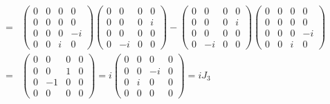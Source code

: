 \documentclass[11pt]{article}
\begin{document}
\section{ }
\begin{eqnarray}
    [J_1,J_2]&=&
    \begin{pmatrix}
        0 & 0 & 0 & 0\\
        0 & 0 & 0 & 0 \\
        0 & 0 & 0 & -i \\
        0 & 0 & i & 0
    \end{pmatrix}
    \begin{pmatrix}
        0 & 0 & 0 & 0 \\
        0 & 0 & 0 & i \\
        0 & 0 & 0 & 0 \\
        0 & -i & 0 & 0 
    \end{pmatrix}
    -
    \begin{pmatrix}
        0 & 0 & 0 & 0 \\
        0 & 0 & 0 & i \\
        0 & 0 & 0 & 0 \\
        0 & -i & 0 & 0 
    \end{pmatrix}
    \begin{pmatrix}
        0 & 0 & 0 & 0\\
        0 & 0 & 0 & 0 \\
        0 & 0 & 0 & -i \\
        0 & 0 & i & 0
    \end{pmatrix}\\ 
    &=&
    \begin{pmatrix}
        0 & 0 & 0 & 0\\
        0 & 0 & 1 & 0\\
        0 &-1 & 0 & 0\\
        0 & 0 & 0 & 0
    \end{pmatrix}
    =i
    \begin{pmatrix}
        0 & 0 & 0 & 0 \\
        0 & 0 & -i & 0 \\
        0 & i & 0 & 0 \\
        0 & 0 & 0 & 0 
    \end{pmatrix}
      =iJ_3 
\end{eqnarray}
\end{document}

